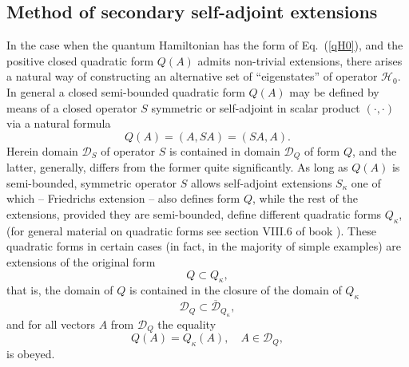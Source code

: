 \documentclass[12pt]{article}
\newcommand{\ol}{\overline}
\newcommand{\DD}{\mathcal{D}}
\newcommand{\HH}{\mathscr{H}}
\begin{document}
\subsection{Method of secondary self-adjoint extensions}
	In the case when the quantum Hamiltonian has the form of 
Eq.~(\ref{qH0}),
	and the positive closed quadratic form
$ Q(A) $
	admits non-trivial extensions,
	there arises a natural way of constructing an alternative
    set of ``eigenstates'' of operator
$ \HH_{0} $.
    In general a closed semi-bounded quadratic form
$ Q(A) $
    may be defined by means of a closed operator
$ S $
    symmetric or self-adjoint
    in scalar product
$ (\cdot , \cdot ) $
	via a natural formula
\begin{equation*}
    Q(A) = (A,SA) = (SA,A).
\end{equation*}
	Herein domain
$ \DD_{S} $
	of operator
$ S $
	is contained in domain
$ \DD_{Q} $
	of form
$ Q $,
	and the latter, generally, differs from the former quite significantly.
    As long as
$ Q(A) $ 
    is semi-bounded, symmetric operator
$ S $
    allows self-adjoint extensions
$ S_{\kappa} $
	one of which -- Friedrichs extension
\cite{FStone} --
	also defines form
$ Q $,
	while the rest of the extensions, provided they are semi-bounded,
	define different quadratic forms
$ Q_{\kappa} $,
(for general material on quadratic forms see section VIII.6 of book
\cite{RS1}).
	These quadratic forms in certain cases (in fact, in the majority of simple examples)
	are extensions of the original form
\begin{equation*}
    Q \subset Q_{\kappa} ,
\end{equation*}
	that is, the domain of 
$ Q $
	is contained in the closure of the domain of 
$ Q_{\kappa} $
\begin{equation*}
    \DD_{Q} \subset \ol{\DD}_{Q_{\kappa}} ,
\end{equation*}
	and for all vectors
$ A $ from
$ \DD_{Q} $
	the equality
\begin{equation*}
    Q(A) = Q_{\kappa}(A) ,\quad A\in \DD_{Q} ,
\end{equation*}
	is obeyed.
\end{document}
